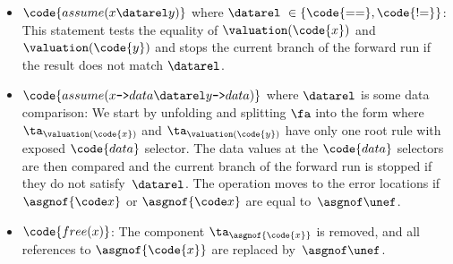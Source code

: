 {\begin{itemize}
      \item $\code{assume(x \datarel y)}$ where $\datarel\ \in \{\code{==},
        \code{{!}{=}}\}$:
        This statement tests the equality of $\valuation(\code{x})$ and $\valuation(\code{y})$
        and stops the current branch of the forward run if the result does not match $\datarel$.
      \item $\code{assume(x\text{\texttt{->}}data \datarel y\text{\texttt{->}}data)}$
        where $\datarel$ is some data comparison:
        We start by unfolding and splitting $\fa$ into the form where
        $\ta_{\valuation(\code{x})}$ and $\ta_{\valuation(\code{y})}$ have only
        one root rule with exposed $\code{data}$ selector.
        The data values at the $\code{data}$ selectors are then compared and
        the current branch of the forward run is stopped if they do not satisfy~$\datarel$.
        The operation moves to the error locations if $\asgnof{\code x}$ or
        $\asgnof{\code x}$ are equal to~$\asgnof \unef$.


		  \item $\code{free(x)}$: The component $\ta_{\asgnof{\code{x}}}$ is removed, 
          and all references to $\asgnof{\code{x}}$ are replaced by~$\asgnof \unef$.
		\end{itemize}

}
